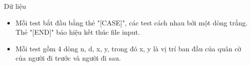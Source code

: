 Dữ liệu
\begin{itemize}
	\item     Mỗi test bắt đầu bằng thẻ "[CASE]", các test cách nhau bởi một dòng trắng. Thẻ "[END]" báo hiệu kết thúc file input.   
	\item     Mỗi test gồm 4 dòng n, d, x, y, trong đó x, y là vị trí ban đầu của quân cờ của người đi trước và người đi sau.   
\end{itemize}